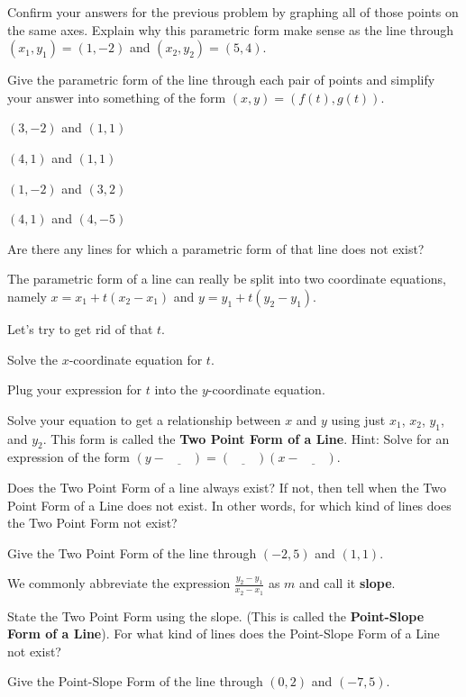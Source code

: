 \bq Confirm your answers for the previous problem by graphing all of those points on the same axes. Explain why this parametric form make sense as the line through $(x_1,y_1)=(1,-2)$ and $(x_2,y_2) = (5,4)$.
\eq

\bq Give the parametric form of the line through each pair of points and simplify your answer into something of the form \break$(x,y)=(f(t),g(t))$.
\be
\item $(3,-2)$ and $(1,1)$
\item $(4,1)$ and $(1,1)$
\item $(1,-2)$ and $(3,2)$
\item $(4,1)$ and $(4,-5)$
\ee
\eq

\bq Are there any lines for which a parametric form of that line does not exist?
\eq

\begin{info} The parametric form of a line can really be split into two coordinate equations, namely $x = x_1+t(x_2-x_1)$ and $y=y_1+t(y_2-y_1)$. \end{info}

\bq\label{q16} Let's try to get rid of that $t$.
\be
\item Solve the $x$-coordinate equation for $t$.
\item Plug your expression for $t$ into the $y$-coordinate equation.
\item Solve your equation to get a relationship between $x$ and $y$ using just $x_1$, $x_2$, $y_1$, and $y_2$. This form is called the \textbf{Two Point Form of a Line}. Hint: Solve for an expression of the form $(y- \underline{\quad \quad} )= (\underline{\quad \quad} )(x- \underline{\quad \quad} )$.
\ee \eq

\bq Does the Two Point Form of a line always exist? If not, then tell when the Two Point Form of a Line does not exist. In other words, for which kind of lines does the Two Point Form not exist?
\eq

\bq Give the Two Point Form of the line through $(-2,5)$ and $(1,1)$.
\eq

\begin{info} We commonly abbreviate the expression $\frac{y_2-y_1}{x_2-x_1}$ as $m$ and call it \textbf{slope}. \end{info}

\bq State the Two Point Form using the slope. (This is called the \textbf{Point-Slope Form of a Line}). For what kind of lines does the Point-Slope Form of a Line not exist?
\eq

\bq Give the Point-Slope Form of the line through $(0,2)$ and $(-7,5)$.
\eq

